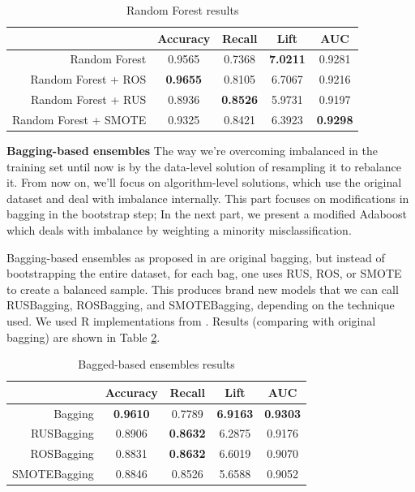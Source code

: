 \documentclass[12pt,letterpaper]{article}
\begin{document}
\begin{table}[!htb]
	\centering
	\addtolength{\tabcolsep}{6pt}
	\begin{tabular}{|r|cccc|}
		\hline
		& Accuracy & Recall & Lift & AUC \\ 
		\hline
		Random Forest  & 0.9565 & 0.7368 & \textbf{7.0211} & 0.9281 \\ 
		Random Forest + ROS &\textbf{ 0.9655} & 0.8105 & 6.7067 & 0.9216 \\ 
		Random Forest + RUS & 0.8936 & \textbf{0.8526} & 5.9731 & 0.9197 \\ 
		Random Forest + SMOTE & 0.9325 & 0.8421 & 6.3923 & \textbf{0.9298} \\ 
		\hline
	\end{tabular}
\caption{Random Forest results}
\label{rf}
\end{table}

\textbf{Bagging-based ensembles}
The way we're overcoming imbalanced in the training set until now is by the data-level solution of resampling it to rebalance it. From now on, we'll focus on algorithm-level solutions, which use the original dataset and deal with imbalance internally. This part focuses on modifications in bagging in the bootstrap step; In the next part, we present a modified Adaboost which deals with imbalance by weighting a minority misclassification.

Bagging-based ensembles as proposed in \cite{ensembles} are original bagging, but instead of bootstrapping the entire dataset, for each bag, one uses RUS, ROS, or SMOTE to create a balanced sample. This produces brand new models that we can call RUSBagging, ROSBagging, and SMOTEBagging, depending on the technique used. We used R implementations from \cite{iric}. Results (comparing with original bagging) are shown in Table \ref{bag2}.

\begin{table}[!htb]
	\centering
	\addtolength{\tabcolsep}{6pt}
	\begin{tabular}{|r|cccc|}
		\hline
		& Accuracy & Recall & Lift & AUC \\ 
		\hline
		Bagging  & \textbf{0.9610} & 0.7789 & \textbf{6.9163} & \textbf{0.9303} \\ 
		RUSBagging & 0.8906 & \textbf{0.8632} & 6.2875 & 0.9176 \\ 
		ROSBagging & 0.8831 & \textbf{0.8632} & 6.6019 & 0.9070 \\ 
		SMOTEBagging & 0.8846 & 0.8526 & 5.6588 & 0.9052 \\ 
		\hline
	\end{tabular}
\caption{Bagged-based ensembles results}
\label{bag2}
\end{table}
\end{document}
